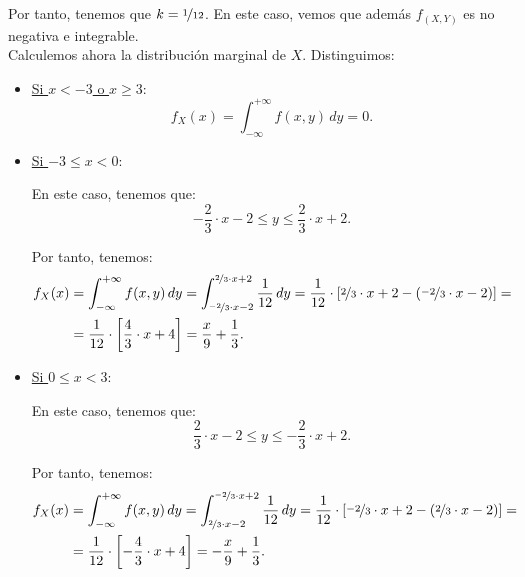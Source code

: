 \begin{ejercicio}
    Por tanto, tenemos que $k=\nicefrac{1}{12}$. En este caso, vemos que además $f_{(X,Y)}$ es no negativa e integrable.\\

    Calculemos ahora la distribución marginal de $X$. Distinguimos:
    \begin{itemize}
        \item \ul{Si $x<-3$ o $x\geq 3$}:
        \begin{equation*}
            f_X(x) = \int_{-\infty}^{+\infty} f(x, y) \, dy = 0.
        \end{equation*}

        \item \ul{Si $-3\leq x<0$}:
    
        En este caso, tenemos que:
        \begin{equation*}
            -\dfrac{2}{3}\cdot x-2 \leq y \leq \dfrac{2}{3}\cdot x+2.
        \end{equation*}

        Por tanto, tenemos:
        \begin{align*}
            f_X(x) &= \int_{-\infty}^{+\infty} f(x, y) \, dy = \int_{\nicefrac{-2}{3}\cdot x-2}^{\nicefrac{2}{3}\cdot x+2} \frac{1}{12} \, dy = \frac{1}{12}\cdot \left[\nicefrac{2}{3}\cdot x+2-\left(\nicefrac{-2}{3}\cdot x-2\right)\right] =\\
            &= \frac{1}{12}\cdot \left[\frac{4}{3}\cdot x+4\right] = \dfrac{x}{9} + \dfrac{1}{3}.
        \end{align*}

        \item \ul{Si $0\leq x<3$}:
        
        En este caso, tenemos que:
        \begin{equation*}
            \frac{2}{3}\cdot x-2 \leq y \leq -\frac{2}{3}\cdot x+2.
        \end{equation*}

        Por tanto, tenemos:
        \begin{align*}
            f_X(x) &= \int_{-\infty}^{+\infty} f(x, y) \, dy = \int_{\nicefrac{2}{3}\cdot x-2}^{\nicefrac{-2}{3}\cdot x+2} \frac{1}{12} \, dy = \frac{1}{12}\cdot \left[\nicefrac{-2}{3}\cdot x+2-\left(\nicefrac{2}{3}\cdot x-2\right)\right] =\\
            &= \frac{1}{12}\cdot \left[-\frac{4}{3}\cdot x+4\right] = -\dfrac{x}{9} + \dfrac{1}{3}.
        \end{align*}
    \end{itemize}


\end{ejercicio}
